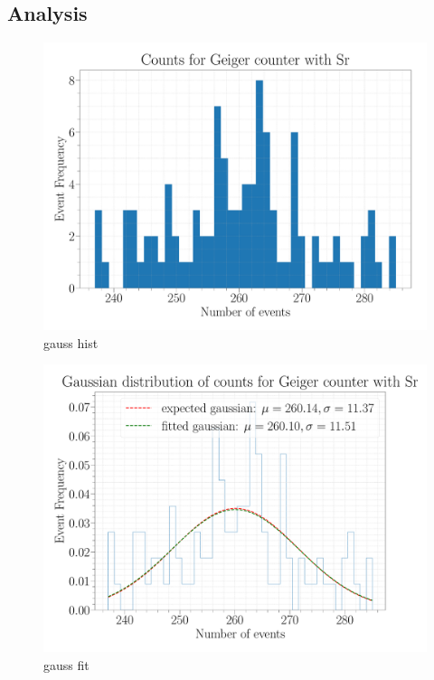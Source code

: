 \subsection{Analysis}

\begin{figure}[H]
\centering
\includegraphics[width=\textwidth]{../Figures/Geiger_gauss_histogram.pdf}
\caption{gauss hist}
\label{fig:GaussHist}
\end{figure}

\begin{figure}[H]
\centering
\includegraphics[width=\textwidth]{../Figures/Geiger_gauss_fit.pdf}
\caption{gauss fit}
\label{fig:GaussFit}
\end{figure}

